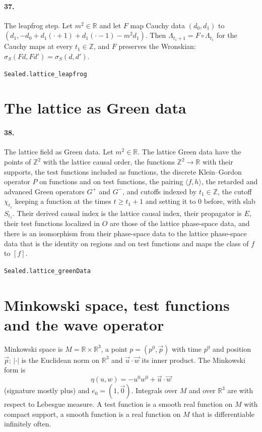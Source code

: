 \documentclass[11pt]{article}
\begin{document}
\paragraph{37.} The leapfrog step. Let $m^2 \in \mathbb R$ and let $F$ map Cauchy data $(d_0, d_1)$ to $(d_1, -d_0 + d_1(\cdot + 1) + d_1(\cdot - 1) - m^2 d_1)$. Then $\Lambda_{t_1 + 1} = F \circ \Lambda_{t_1}$ for the Cauchy maps at every $t_1 \in \mathbb Z$, and $F$ preserves the Wronskian: $\sigma_S(F d, F d') = \sigma_S(d, d')$.\par{\footnotesize\texttt{Sealed.lattice\_leapfrog}}

\section*{The lattice as Green data}
\paragraph{38.} The lattice field as Green data. Let $m^2 \in \mathbb R$. The lattice Green data have the points of $\mathbb Z^2$ with the lattice causal order, the functions $\mathbb Z^2 \to \mathbb R$ with their supports, the test functions included as functions, the discrete Klein–Gordon operator $P$ on functions and on test functions, the pairing $\langle f, h \rangle$, the retarded and advanced Green operators $G^+$ and $G^-$, and cutoffs indexed by $t_1 \in \mathbb Z$, the cutoff $\chi_{t_1}$ keeping a function at the times $t \ge t_1 + 1$ and setting it to $0$ before, with slab $S_{t_1}$. Their derived causal index is the lattice causal index, their propagator is $E$, their test functions localized in $O$ are those of the lattice phase-space data, and there is an isomorphism from their phase-space data to the lattice phase-space data that is the identity on regions and on test functions and maps the class of $f$ to $[f]$.\par{\footnotesize\texttt{Sealed.lattice\_greenData}}

\section*{Minkowski space, test functions and the wave operator}
Minkowski space is $M = \mathbb R \times \mathbb R^3$, a point $p = (p^0, \vec p)$ with time $p^0$ and position $\vec p$; $|\cdot|$ is the Euclidean norm on $\mathbb R^3$ and $\vec u \cdot \vec w$ its inner product. The Minkowski form is \[\eta(u, w) = -u^0 w^0 + \vec u \cdot \vec w\] (signature mostly plus) and $e_0 = (1, \vec 0)$. Integrals over $M$ and over $\mathbb R^3$ are with respect to Lebesgue measure. A test function is a smooth real function on $M$ with compact support, a smooth function is a real function on $M$ that is differentiable infinitely often.
\end{document}
